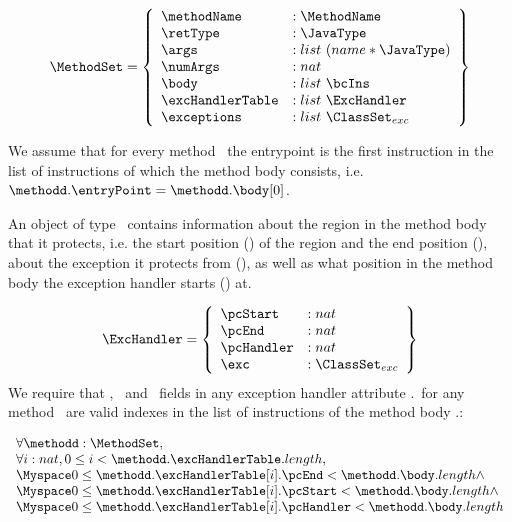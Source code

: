  $$ \begin{array}{l} %
                     \MethodSet  = \left\{\begin{array}{ll}  \methodName & :\MethodName\\
						          \retType & :\JavaType\\
							  \args &  : list \ (name * \JavaType) \\
							  \numArgs & : nat \\
							  \body &  : list \ \bcIns \\
							  \excHandlerTable & : list \ \ExcHandler \\
							  \exceptions & : list \ \ClassSet_{exc}
                                     \end{array}  \right\}
     \end{array} $$
  
 We assume that for every method \methodd \ the entrypoint is the first instruction in the list of instructions 
 of which the method body consists, i.e. $ \methodd.\entryPoint =\methodd.\body[0]$.

 An object of type \ExcHandler \ contains information about the region in the method body that it protects, i.e. the start
 position (\pcStart) of the region and the end position (\pcEnd), about the exception it protects from (\exc),
 as well as what position in the method body the exception handler starts (\pcHandler) at.


 $$ \begin{array}{l}  
                 \ExcHandler = \left\{\begin{array}{ll} \pcStart & : nat \\
						          \pcEnd & : nat \\
							  \pcHandler &  : nat \\
							  \exc & : \ClassSet_{exc} 
                                        \end{array}  \right\}
     \end{array} $$
   We require that \pcStart, \pcEnd \ and \pcHandler \ fields in any exception handler attribute \methodd.\excHandlerTable \ for any method \methodd \
   are valid indexes in the list  of instructions of the method body  \methodd.\body :
 
$$ \begin{array}{l}  \forall \methodd: \MethodSet,  \\
                      \forall i:nat, 0 \le i <  \methodd.\excHandlerTable.length,  \\
                            \Myspace 0 \le \methodd.\excHandlerTable[i].\pcEnd <  \methodd.\body.length \wedge  \\
			    \Myspace 0 \le \methodd.\excHandlerTable[i].\pcStart <  \methodd.\body.length  \wedge \\
			    \Myspace 0 \le \methodd.\excHandlerTable[i].\pcHandler <  \methodd.\body.length  
    \end{array}
 $$


 
  
